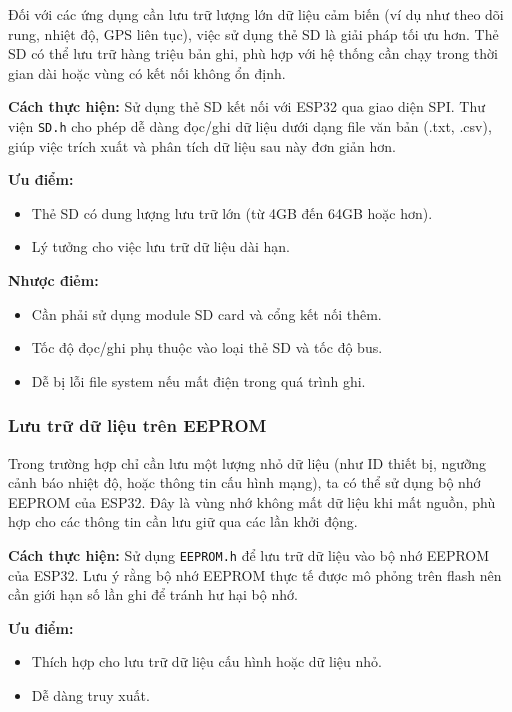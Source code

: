 Đối với các ứng dụng cần lưu trữ lượng lớn dữ liệu cảm biến (ví dụ như theo dõi rung, nhiệt độ, GPS liên tục), việc sử dụng thẻ SD là giải pháp tối ưu hơn. Thẻ SD có thể lưu trữ hàng triệu bản ghi, phù hợp với hệ thống cần chạy trong thời gian dài hoặc vùng có kết nối không ổn định.

\textbf{Cách thực hiện:} Sử dụng thẻ SD kết nối với ESP32 qua giao diện SPI. Thư viện \texttt{SD.h} cho phép dễ dàng đọc/ghi dữ liệu dưới dạng file văn bản (.txt, .csv), giúp việc trích xuất và phân tích dữ liệu sau này đơn giản hơn.

\textbf{Ưu điểm:}
\begin{itemize}
    \item Thẻ SD có dung lượng lưu trữ lớn (từ 4GB đến 64GB hoặc hơn).
    \item Lý tưởng cho việc lưu trữ dữ liệu dài hạn.
\end{itemize}

\textbf{Nhược điẻm:}
\begin{itemize}
    \item Cần phải sử dụng module SD card và cổng kết nối thêm.
    \item Tốc độ đọc/ghi phụ thuộc vào loại thẻ SD và tốc độ bus.
    \item Dễ bị lỗi file system nếu mất điện trong quá trình ghi.
\end{itemize}

\subsubsection{Lưu trữ dữ liệu trên EEPROM}

Trong trường hợp chỉ cần lưu một lượng nhỏ dữ liệu (như ID thiết bị, ngưỡng cảnh báo nhiệt độ, hoặc thông tin cấu hình mạng), ta có thể sử dụng bộ nhớ EEPROM của ESP32. Đây là vùng nhớ không mất dữ liệu khi mất nguồn, phù hợp cho các thông tin cần lưu giữ qua các lần khởi động.

\textbf{Cách thực hiện:} Sử dụng \texttt{EEPROM.h} để lưu trữ dữ liệu vào bộ nhớ EEPROM của ESP32. Lưu ý rằng bộ nhớ EEPROM thực tế được mô phỏng trên flash nên cần giới hạn số lần ghi để tránh hư hại bộ nhớ.


\textbf{Ưu điểm:}
\begin{itemize}
    \item Thích hợp cho lưu trữ dữ liệu cấu hình hoặc dữ liệu nhỏ.
    \item Dễ dàng truy xuất.
\end{itemize}

